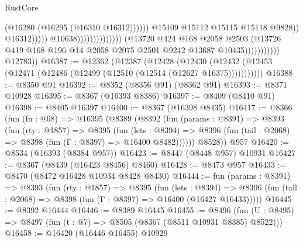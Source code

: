 \begin{lexlean}{RustCore}
\begin{coremodule}
                                                                          (@16280
                                                                            (@16295
                                                                              (@16310 @16312))))))
                                                                    @15109
                                                                    @15112
                                                                    @15115
                                                                    @15118
                                                                    @9828))
                                                                @16312)))))
                                                      @10638))))))))))))))
                          (@13720
                            @424
                            @168
                            @2058
                            @2503
                            (@13726
                              @419
                              @168
                              @196
                              @14
                              @2058
                              @2075
                              @2501
                              @9242
                              @13687
                              @10435)))))))))))
        @12783))
@16387 := @12362
    (@12387
      (@12428
        (@12430 (@12432 (@12453 (@12471 (@12486 (@12499 (@12510 (@12514 (@12627 @16375)))))))))))
@16388 := @8350 @91
@16392 := @8352 (@8356 @91) (@8362 @91)
@16393 := @8371 @10928
@16395 := @8367 (@16393 @8386)
@16397 := @8409 (@8410 @91)
@16398 := @8405 @16397
@16400 := @8367 (@16398 @8435)
@16417 := @8366
    (fun (fn : @68) =>
    @16395
      (@8389
        (@8392
          (fun (params : @8391) =>
          @8393
            (fun (rty : @1857) =>
            @8395
              (fun (lets : @8394) =>
              @8396 (fun (tail : @2068) => @8398 (fun (Γ : @8397) => @16400 @8482))))))
        @8528))
    @957
@16420 := @8534 (@16393 (@8384 @957))
@16423 := @8447 (@8448 @957) @10931
@16427 := @8367 (@8439 (@16423 @8456) @8460)
@16428 := @8473 @957
@16433 := @8470 (@8472 @16428 @10934 @8428 @8430)
@16444 := fun (params : @8391) =>
  @8393
    (fun (rty : @1857) =>
    @8395
      (fun (lets : @8394) =>
      @8396 (fun (tail : @2068) => @8398 (fun (Γ : @8397) => @16400 (@16427 @16433)))))
@16445 := @8392 @16444
@16446 := @8389 @16445
@16455 := @8496
    (fun (U : @8495) => @8497 (fun (t : @7) => @8505 (@8367 (@8511 @10931 @8385) @8522)))
@16458 := @16420 (@16446 @16455) @10929

\end{coremodule}
\end{lexlean}
